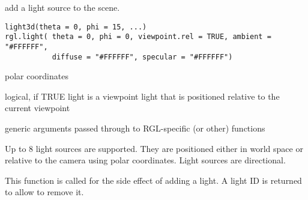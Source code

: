 \begin{Description}\relax
add a light source to the scene.
\end{Description}
\begin{Usage}
\begin{verbatim}
light3d(theta = 0, phi = 15, ...)
rgl.light( theta = 0, phi = 0, viewpoint.rel = TRUE, ambient = "#FFFFFF", 
           diffuse = "#FFFFFF", specular = "#FFFFFF")
\end{verbatim}
\end{Usage}
\begin{Arguments}
\begin{ldescription}
\item[\code{theta, phi}] polar coordinates
\item[\code{viewpoint.rel}] logical, if TRUE light is a viewpoint light that is positioned relative to the current viewpoint
\item[\code{ambient, diffuse, specular }] 
\item[\code{...}] generic arguments passed through to RGL-specific (or other) functions
\end{ldescription}
\end{Arguments}
\begin{Details}\relax
Up to 8 light sources are supported. They are positioned either in world space
or relative to the camera using polar coordinates. Light sources are directional.
\end{Details}
\begin{Value}
This function is called for the side effect of adding a light.  A light ID is
returned to allow  to remove it.
\end{Value}
\begin{SeeAlso}\relax
{}
\end{SeeAlso}

